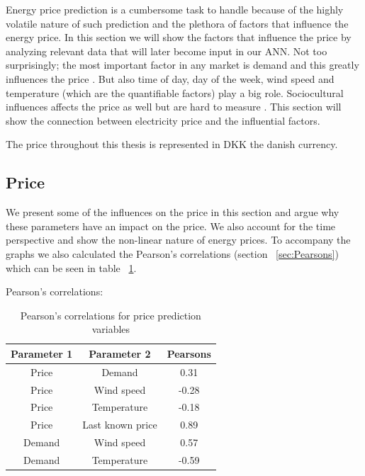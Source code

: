 Energy price prediction is a cumbersome task to handle because of the highly volatile nature of such prediction \cite{pjmForecast, yamin2004adaptive} and the plethora of factors that influence the energy price\cite{singhal2011electricity}. In this section we will show the factors that influence the price by analyzing relevant data that will later become input in our ANN. Not too surprisingly; the most important factor in any market is demand and this greatly influences the price \cite{supplyAndDemand}. But also time of day, day of the week, wind speed and temperature (which are the quantifiable factors) play a big role. Sociocultural influences affects the price as well but are hard to measure \cite{singhal2011electricity}. This section will show the connection between electricity price and the influential factors.

The price throughout this thesis is represented in DKK the danish currency.

\subsection{Price}\label{sec:Price}
We present some of the influences on the price in this section and argue why these parameters have an impact on the price. We also account for the time perspective and show the non-linear nature of energy prices. To accompany the graphs we also calculated the Pearson's correlations (section ~\ref{sec:Pearsons}) which can be seen in table ~\ref{table:pearsonsPriceVariables}.

Pearson's correlations:
\begin{table}[H]
\centering  %
\begin{tabular}{|c|c|c|} %
 \hline
 Parameter 1 & Parameter 2 & Pearsons \\ [0.5ex] %
\hline                  %
Price & Demand & 0.31 \\ \hline
Price & Wind speed & -0.28  \\ \hline
Price & Temperature & -0.18 \\ \hline
Price & Last known price & 0.89 \\ \hline
Demand & Wind speed & 0.57 \\ \hline
Demand & Temperature & -0.59 \\ \hline
\end{tabular}
\caption{Pearson's correlations for price prediction variables} %
\label{table:pearsonsPriceVariables} %
\end{table}

